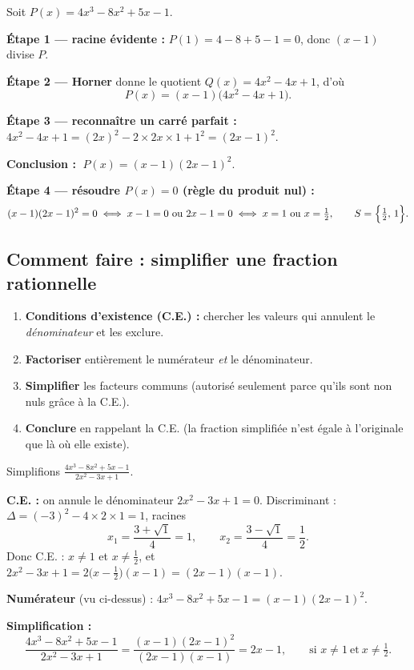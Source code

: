 \documentclass[11pt,a4paper]{article}
\begin{document}
\begin{exemple}
Soit $P(x)=4x^{3}-8x^{2}+5x-1$.

\textbf{Étape 1 — racine évidente :} $P(1)=4-8+5-1=0$, donc $(x-1)$ divise $P$.

\textbf{Étape 2 — Horner} donne le quotient $Q(x)=4x^{2}-4x+1$, d'où
\[ P(x)=(x-1)\bigl(4x^{2}-4x+1\bigr). \]

\textbf{Étape 3 — reconnaître un carré parfait :} $4x^{2}-4x+1=(2x)^{2}-2\times 2x\times 1+1^{2}=(2x-1)^{2}$.

\textbf{Conclusion :} $\;P(x)=(x-1)(2x-1)^{2}$.

\textbf{Étape 4 — résoudre $P(x)=0$ (règle du produit nul) :}
\[ (x-1)(2x-1)^{2}=0 \;\Longleftrightarrow\; x-1=0\ \text{ou}\ 2x-1=0
   \;\Longleftrightarrow\; x=1\ \text{ou}\ x=\tfrac12,\qquad S=\Bigl\{\tfrac12,\,1\Bigr\}. \]
\end{exemple}

\subsection{Comment faire : simplifier une fraction rationnelle}

\begin{commentfaire}
\begin{enumerate}[leftmargin=2em,topsep=2pt,itemsep=2pt]
  \item \textbf{Conditions d'existence (C.E.) :} chercher les valeurs qui annulent le \emph{dénominateur} et les exclure.
  \item \textbf{Factoriser} entièrement le numérateur \emph{et} le dénominateur.
  \item \textbf{Simplifier} les facteurs communs (autorisé seulement parce qu'ils sont non nuls grâce à la C.E.).
  \item \textbf{Conclure} en rappelant la C.E. (la fraction simplifiée n'est égale à l'originale que là où elle existe).
\end{enumerate}
\end{commentfaire}

\begin{exemple}
Simplifions $\displaystyle \frac{4x^{3}-8x^{2}+5x-1}{2x^{2}-3x+1}$.

\textbf{C.E. :} on annule le dénominateur $2x^{2}-3x+1=0$. Discriminant : $\Delta=(-3)^{2}-4\times2\times1=1$, racines
\[ x_1=\frac{3+\sqrt1}{4}=1,\qquad x_2=\frac{3-\sqrt1}{4}=\frac{1}{2}. \]
Donc C.E. : $x\neq 1$ et $x\neq\tfrac12$, et $2x^{2}-3x+1=2\bigl(x-\tfrac12\bigr)(x-1)=(2x-1)(x-1)$.

\textbf{Numérateur} (vu ci-dessus) : $4x^{3}-8x^{2}+5x-1=(x-1)(2x-1)^{2}$.

\textbf{Simplification :}
\[ \frac{4x^{3}-8x^{2}+5x-1}{2x^{2}-3x+1}
   =\frac{(x-1)(2x-1)^{2}}{(2x-1)(x-1)}
   =2x-1,\qquad \text{si } x\neq 1\ \text{et}\ x\neq\tfrac12. \]
\end{exemple}
\end{document}
